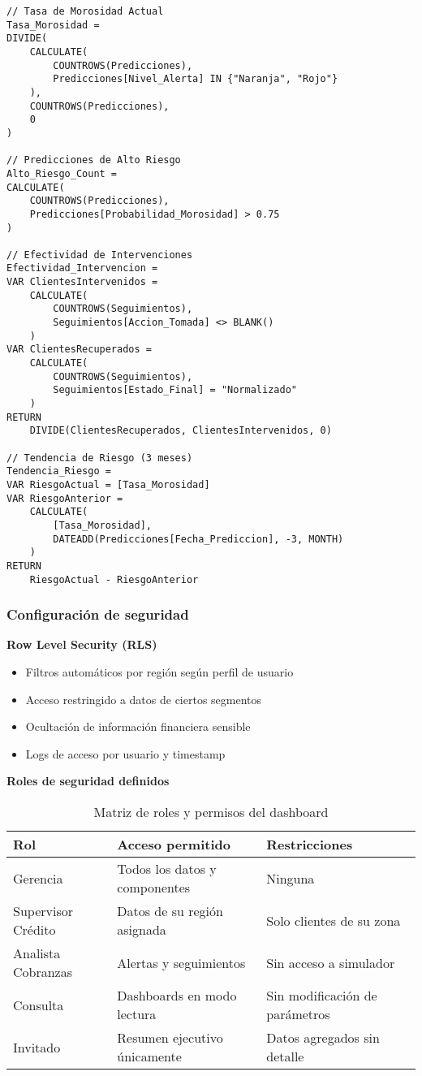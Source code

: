 \begin{verbatim}
// Tasa de Morosidad Actual
Tasa_Morosidad = 
DIVIDE(
    CALCULATE(
        COUNTROWS(Predicciones),
        Predicciones[Nivel_Alerta] IN {"Naranja", "Rojo"}
    ),
    COUNTROWS(Predicciones),
    0
)

// Predicciones de Alto Riesgo
Alto_Riesgo_Count = 
CALCULATE(
    COUNTROWS(Predicciones),
    Predicciones[Probabilidad_Morosidad] > 0.75
)

// Efectividad de Intervenciones
Efectividad_Intervencion = 
VAR ClientesIntervenidos = 
    CALCULATE(
        COUNTROWS(Seguimientos),
        Seguimientos[Accion_Tomada] <> BLANK()
    )
VAR ClientesRecuperados = 
    CALCULATE(
        COUNTROWS(Seguimientos),
        Seguimientos[Estado_Final] = "Normalizado"
    )
RETURN
    DIVIDE(ClientesRecuperados, ClientesIntervenidos, 0)

// Tendencia de Riesgo (3 meses)
Tendencia_Riesgo = 
VAR RiesgoActual = [Tasa_Morosidad]
VAR RiesgoAnterior = 
    CALCULATE(
        [Tasa_Morosidad],
        DATEADD(Predicciones[Fecha_Prediccion], -3, MONTH)
    )
RETURN
    RiesgoActual - RiesgoAnterior
\end{verbatim}

\subsubsection{Configuración de seguridad}

\textbf{Row Level Security (RLS)}
\begin{itemize}
    \item Filtros automáticos por región según perfil de usuario
    \item Acceso restringido a datos de ciertos segmentos
    \item Ocultación de información financiera sensible
    \item Logs de acceso por usuario y timestamp
\end{itemize}

\textbf{Roles de seguridad definidos}
\begin{table}[ht]
\centering
\begin{tabular}{|p{3cm}|p{5cm}|p{6cm}|}
\hline
\textbf{Rol} & \textbf{Acceso permitido} & \textbf{Restricciones} \\
\hline
Gerencia & Todos los datos y componentes & Ninguna \\
\hline
Supervisor Crédito & Datos de su región asignada & Solo clientes de su zona \\
\hline
Analista Cobranzas & Alertas y seguimientos & Sin acceso a simulador \\
\hline
Consulta & Dashboards en modo lectura & Sin modificación de parámetros \\
\hline
Invitado & Resumen ejecutivo únicamente & Datos agregados sin detalle \\
\hline
\end{tabular}
\caption{Matriz de roles y permisos del dashboard}
\end{table}

